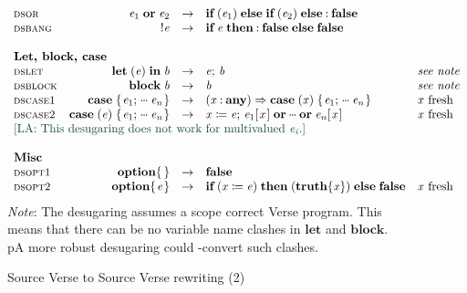\begin{figure}
$$\begin{array}{lrcll}
\rulename{dsor}  &   \ensuremath{\Varid{e}_{\mathrm{1}}\;\textbf{or}\;\Varid{e}_{\mathrm{2}}} & \rightarrow & \ensuremath{\textbf{if}\;(\Varid{e}_{\mathrm{1}})\;\textbf{else}\;\textbf{if}\;(\Varid{e}_{\mathrm{2}})\;\textbf{else}\mathbin{:}\textbf{false}} \\
\rulename{dsbang} &   \ensuremath{\mathbin{!}\Varid{e}} & \rightarrow & \ensuremath{\textbf{if}\;\Varid{e}\;\textbf{then}\mathbin{:}\textbf{false}\;\textbf{else}\;\textbf{false}} \\
  \\
  \multicolumn{5}{l}{\textbf{Let, block, case}} \\
\rulename{dslet}   &    \ensuremath{\mathbf{let}\;(\Varid{e})\;\textbf{in}\;\Varid{b}} & \rightarrow & \ensuremath{\Varid{e};\,\Varid{b}} & \textit{see note} \\
\rulename{dsblock} &    \ensuremath{\textbf{block}\;\Varid{b}} & \rightarrow & \ensuremath{\Varid{b}} & \textit{see note}  \\
\rulename{dscase1} &    \ensuremath{\textbf{case}\;\{\mskip1.5mu \Varid{e}_{\mathrm{1}};\,\mydots\;\Varid{e}_{\Varid{n}}\mskip1.5mu\}} & \rightarrow & \ensuremath{(\Varid{x}\mathbin{:}\textbf{any})\Rightarrow \textbf{case}\;(\Varid{x})\;\{\mskip1.5mu \Varid{e}_{\mathrm{1}};\,\mydots\;\Varid{e}_{\Varid{n}}\mskip1.5mu\}} & \text{\ensuremath{\Varid{x}} fresh} \\
\rulename{dscase2} &    \ensuremath{\textbf{case}\;(\Varid{e})\;\{\mskip1.5mu \Varid{e}_{\mathrm{1}};\,\mydots\;\Varid{e}_{\Varid{n}}\mskip1.5mu\}} & \rightarrow & \ensuremath{\Varid{x}\mathrel{\coloneqq}\Varid{e};\,\Varid{e}_{\mathrm{1}} [\mskip1.5mu \Varid{x}\mskip1.5mu]\;\textbf{or}\;\mydots\;\textbf{or}\;\Varid{e}_{\Varid{n}} [\mskip1.5mu \Varid{x}\mskip1.5mu]} & \text{\ensuremath{\Varid{x}} fresh} \\
  \multicolumn{5}{l}{\lennart{This desugaring does not work for multivalued \ensuremath{\Varid{e}_{\Varid{i}}}.}} \\
  \\
  \multicolumn{5}{l}{\textbf{Misc}} \\
\rulename{dsopt1} &   \ensuremath{\textbf{option} \{\mskip1.5mu \mskip1.5mu\}} & \rightarrow & \ensuremath{\textbf{false}} \\
\rulename{dsopt2} &   \ensuremath{\textbf{option} \{\mskip1.5mu \Varid{e}\mskip1.5mu\}} & \rightarrow & \ensuremath{\textbf{if}\;(\Varid{x}\mathrel{\coloneqq}\Varid{e})\;\textbf{then}\;(\textbf{truth}\{\Varid{x}\})\;\textbf{else}\;\textbf{false}} & \text{\ensuremath{\Varid{x}} fresh} \\
\end{array}
$$
{\em Note}: The desugaring assumes a scope correct Verse program.
This means that there can be no variable name clashes in \ensuremath{\mathbf{let}} and \ensuremath{\textbf{block}}.
pA more robust desugaring could \textalpha-convert such clashes.
\caption{Source Verse to Source Verse rewriting (2)} \label{fig:sv-to-sv-2}
\end{figure}
